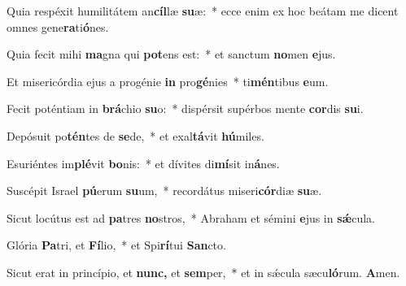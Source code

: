 \item Quia respéxit humilitátem an\textbf{cíl}læ \textbf{su}æ:~* ecce enim ex hoc beátam me dicent omnes gene\textbf{ra}ti\textbf{ó}nes.

\item Quia fecit mihi \textbf{ma}gna qui \textbf{pot}ens est:~* et sanctum \textbf{no}men \textbf{e}jus.

\item Et misericórdia ejus a progénie \textbf{in} pro\textbf{gé}nies~* ti\textbf{mén}tibus \textbf{e}um.

\item Fecit poténtiam in \textbf{brá}chio \textbf{su}o:~* dispérsit supérbos mente \textbf{cor}dis \textbf{su}i.

\item Depósuit po\textbf{tén}tes de \textbf{se}de,~* et exal\textbf{tá}vit \textbf{hú}miles.

\item Esuriéntes im\textbf{plé}vit \textbf{bo}nis:~* et dívites di\textbf{mí}sit in\textbf{á}nes.

\item Suscépit Israel \textbf{pú}erum \textbf{su}um,~* recordátus miseri\textbf{cór}diæ \textbf{su}æ.

\item Sicut locútus est ad \textbf{pa}tres \textbf{no}stros,~* Abraham et sémini \textbf{e}jus in \textbf{sǽ}cula.

\item Glória \textbf{Pa}tri, et \textbf{Fí}lio,~* et Spi\textbf{rí}tui \textbf{San}cto.

\item Sicut erat in princípio, et \textbf{nunc,} et \textbf{sem}per,~* et in sǽcula sæcu\textbf{ló}rum. \textbf{A}men.
